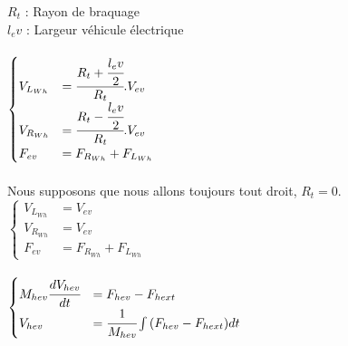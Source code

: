 $ R_t $ : Rayon de braquage\\
$ l_ev $ : Largeur véhicule électrique\\
~\\
$\begin{cases}
	V_{L_{Wh}} &= \cfrac{R_t+\cfrac{l_ev}{2}}{R_t}.V_{ev} \\
	V_{R_{Wh}} &= \cfrac{R_t-\cfrac{l_ev}{2}}{R_t}.V_{ev}\\
	F_{ev} &= F_{R_{Wh}} + F_{L_{Wh}}
\end{cases}$\\
~\\Nous supposons que nous allons toujours tout droit, $ R_t = 0 $.\\
$\begin{cases}
	V_{L_{Wh}} &= V_{ev} \\
	V_{R_{Wh}} &= V_{ev}\\
	F_{ev} &= F_{R_{Wh}} + F_{L_{Wh}}
\end{cases}$\\
~\\
$\begin{cases}
	M_{hev}\cfrac{dV_{hev}}{dt} &= F_{hev}-F_{hext} \\
	V_{hev} &= \cfrac{1}{M_{hev}}\int{(F_{hev}-F_{hext})dt}
\end{cases}$
 
